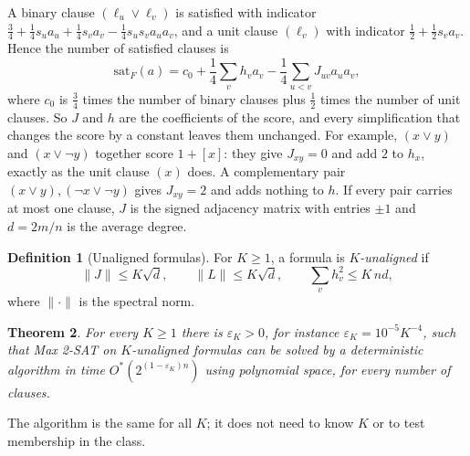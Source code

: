 \documentclass[11pt,a4paper]{article}
\newtheorem{theorem}{Theorem}
\theoremstyle{definition}
\newtheorem{definition}[theorem]{Definition}
\theoremstyle{remark}
\newcommand{\Ostar}{O^{*}}
\newcommand{\sat}{\mathrm{sat}}
\begin{document}
A binary clause $(\ell_u\lor\ell_v)$ is satisfied with indicator
$\frac34+\frac14s_ua_u+\frac14s_va_v-\frac14s_us_va_ua_v$, and a unit clause
$(\ell_v)$ with indicator $\frac12+\frac12s_va_v$. Hence the number of
satisfied clauses is
\[
 \sat_F(a)=c_0+\frac14\sum_vh_va_v-\frac14\sum_{u<v}J_{uv}a_ua_v ,
\]
where $c_0$ is $\frac34$ times the number of binary clauses plus $\frac12$
times the number of unit clauses. So $J$ and $h$ are the coefficients of the score, and every simplification that
changes the score by a constant leaves them unchanged. For example,
$(x\lor y)$ and $(x\lor\neg y)$ together score $1+[x]$: they give $J_{xy}=0$
and add $2$ to $h_x$, exactly as the unit clause $(x)$ does. A complementary
pair $(x\lor y),(\neg x\lor\neg y)$ gives $J_{xy}=2$ and adds nothing to $h$.
If every pair carries at most one clause, $J$ is the signed adjacency matrix
with entries $\pm1$ and $d=2m/n$ is the average degree.

\begin{definition}[Unaligned formulas]\label{def:unaligned}
For $K\ge1$, a formula is \emph{$K$-unaligned} if
\[
 \|J\|\le K\sqrt d,\qquad \|L\|\le K\sqrt d,\qquad \sum_vh_v^2\le K\,nd,
\]
where $\|\cdot\|$ is the spectral norm.
\end{definition}

\begin{theorem}\label{thm:main}
For every $K\ge1$ there is $\varepsilon_K>0$, for instance
$\varepsilon_K=10^{-5}K^{-4}$, such that Max 2-SAT on $K$-unaligned formulas
can be solved by a deterministic algorithm in time
$\Ostar(2^{(1-\varepsilon_K)n})$ using polynomial space, for every number of
clauses.
\end{theorem}

The algorithm is the same for all $K$; it does not need to know $K$ or to test
membership in the class.
\end{document}

